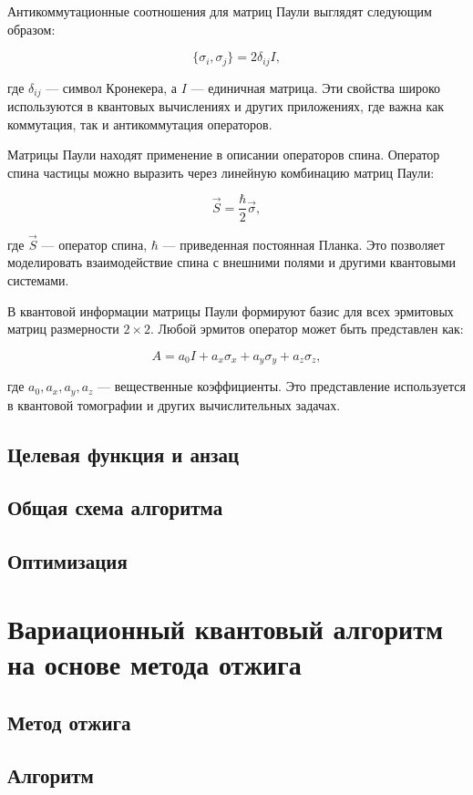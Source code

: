 \documentclass[a4paper]{report}
\begin{document}
Антикоммутационные соотношения для матриц Паули выглядят следующим образом:

$$
\{\sigma_i, \sigma_j\} = 2\delta_{ij}I,
$$

где $\delta_{ij}$ — символ Кронекера, а $I$ — единичная матрица. Эти свойства широко используются в квантовых вычислениях и других приложениях, где важна как коммутация, так и антикоммутация операторов.

Матрицы Паули находят применение в описании операторов спина. Оператор спина частицы можно выразить через линейную комбинацию матриц Паули:

$$
\vec{S} = \frac{\hbar}{2} \vec{\sigma},
$$

где $\vec{S}$ — оператор спина, $\hbar$ — приведенная постоянная Планка. Это позволяет моделировать взаимодействие спина с внешними полями и другими квантовыми системами.

В квантовой информации матрицы Паули формируют базис для всех эрмитовых матриц размерности $2 \times 2$. Любой эрмитов оператор может быть представлен как:

$$
A = a_0 I + a_x \sigma_x + a_y \sigma_y + a_z \sigma_z,
$$

где $a_0, a_x, a_y, a_z$ — вещественные коэффициенты. Это представление используется в квантовой томографии и других вычислительных задачах.


\section{Целевая функция и анзац}

\section{Общая схема алгоритма}

\section{Оптимизация}

\chapter{Вариационный квантовый алгоритм на основе метода отжига}

\section{Метод отжига}

\section{Алгоритм}
\end{document}
